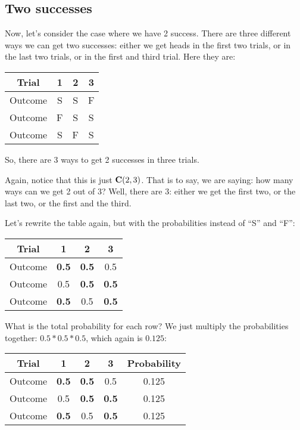 \documentclass[../../../main.tex]{subfiles}
\begin{document}
\subsection{Two successes}

Now, let's consider the case where we have 2 success. There are three different ways we can get two successes: either we get heads in the first two trials, or in the last two trials, or in the first and third trial. Here they are:

\begin{center}
  \begin{tabular}{| c | c | c | c |}
    \hline
      \textbf{Trial} & \textbf{1} & \textbf{2} & \textbf{3} \\ \hline
  Outcome & S & S & F \\ \hline
  Outcome & F & S & S \\ \hline
  Outcome & S & F & S \\ \hline
  \end{tabular}
\end{center}

\noindent
So, there are 3 ways to get 2 successes in three trials.

Again, notice that this is just $\mathbf{C}(2, 3)$. That is to say, we are saying: how many ways can we get 2 out of 3? Well, there are 3: either we get the first two, or the last two, or the first and the third.

Let's rewrite the table again, but with the probabilities instead of ``S'' and ``F'':

\begin{center}
  \begin{tabular}{| c | c | c | c |}
    \hline
      \textbf{Trial} & \textbf{1} & \textbf{2} & \textbf{3} \\ \hline
  Outcome & \textbf{0.5} & \textbf{0.5} & 0.5 \\ \hline
  Outcome & 0.5 & \textbf{0.5} & \textbf{0.5} \\ \hline
  Outcome & \textbf{0.5} & 0.5 & \textbf{0.5} \\ \hline
  \end{tabular}
\end{center}

\noindent
What is the total probability for each row? We just multiply the probabilities together: $0.5 * 0.5 * 0.5$, which again is $0.125$:

\begin{center}
  \begin{tabular}{| c | c | c | c | c |}
    \hline
      \textbf{Trial} & \textbf{1} & \textbf{2} & \textbf{3} & \textbf{Probability} \\ \hline
  Outcome & \textbf{0.5} & \textbf{0.5} & 0.5 & 0.125  \\ \hline
  Outcome & 0.5 & \textbf{0.5} & \textbf{0.5} & 0.125 \\ \hline
  Outcome & \textbf{0.5} & 0.5 & \textbf{0.5} & 0.125 \\ \hline
  \end{tabular}
\end{center}
\end{document}
